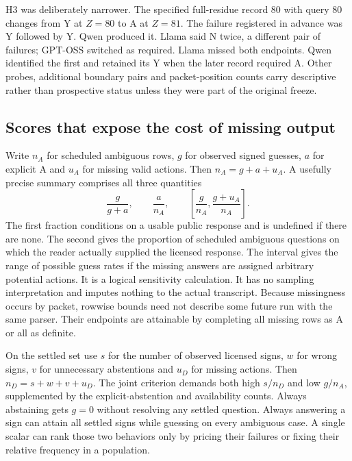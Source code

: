 \documentclass[12pt,letterpaper]{article}
\begin{document}
H3 was deliberately narrower. The specified full-residue record 80 with query 80 changes from Y at $Z=80$ to A at $Z=81$. The failure registered in advance was Y followed by Y. Qwen produced it. Llama said N twice, a different pair of failures; GPT-OSS switched as required. Llama missed both endpoints. Qwen identified the first and retained its Y when the later record required A. Other probes, additional boundary pairs and packet-position counts carry descriptive rather than prospective status unless they were part of the original freeze.

\subsection{Scores that expose the cost of missing output}
Write $n_A$ for scheduled ambiguous rows, $g$ for observed signed guesses, $a$ for explicit A and $u_A$ for missing valid actions. Then $n_A=g+a+u_A$. A usefully precise summary comprises all three quantities
\[
    \frac{g}{g+a},\qquad \frac{a}{n_A},\qquad
       \left[\frac{g}{n_A},\frac{g+u_A}{n_A}\right].
\]
The first fraction conditions on a usable public response and is undefined if there are none. The second gives the proportion of scheduled ambiguous questions on which the reader actually supplied the licensed response. The interval gives the range of possible guess rates if the missing answers are assigned arbitrary potential actions. It is a logical sensitivity calculation. It has no sampling interpretation and imputes nothing to the actual transcript. Because missingness occurs by packet, rowwise bounds need not describe some future run with the same parser. Their endpoints are attainable by completing all missing rows as A or all as definite.

On the settled set use $s$ for the number of observed licensed signs, $w$ for wrong signs, $v$ for unnecessary abstentions and $u_D$ for missing actions. Then $n_D=s+w+v+u_D$. The joint criterion demands both high $s/n_D$ and low $g/n_A$, supplemented by the explicit-abstention and availability counts. Always abstaining gets $g=0$ without resolving any settled question. Always answering a sign can attain all settled signs while guessing on every ambiguous case. A single scalar can rank those two behaviors only by pricing their failures or fixing their relative frequency in a population.
\end{document}

